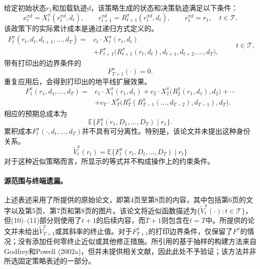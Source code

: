 \documentclass{article}
\begin{document}
给定初始状态$r_1$和加载轨迹$d$，该策略生成的状态和决策轨迹满足以下条件：
\begin{equation}
x_t^{\pi d}=X_t^\pi(r_t^{\pi d},d_t),\qquad
r_{t+1}^{\pi d}=R_{t+1}^\pi(r_t^{\pi d},d_t),\qquad
r_1^{\pi d}=r_1,
\quad t\in\mathcal T.
\tag{18}
\end{equation}
该政策下的实际累计成本是通过递归方式定义的。
\begin{equation}
\begin{aligned}
F_t^\pi(r_t,d_t,d_{t+1},\ldots,d_T)
={}&c_t\cdot X_t^\pi(r_t,d_t)\\
&+F_{t+1}^\pi\bigl(R_{t+1}^\pi(r_t,d_t),d_{t+1},d_{t+2},\ldots,d_T\bigr),
\end{aligned}
\qquad t\in\mathcal T,
\tag{5}
\end{equation}
带有打印出的边界条件的
\[
F_{T+1}^\pi(\cdot)=0.
\]
重复应用后，会得到打印出的地平线扩展效果。
\begin{equation}
\begin{aligned}
F_1^\pi(r_1,d_1,\ldots,d_T)
={}&c_1\cdot X_1^\pi(r_1,d_1)
+c_2\cdot X_2^\pi\bigl(R_2^\pi(r_1,d_1),d_2\bigr)+\cdots\\
&+c_T\cdot X_T^\pi\bigl(R_T^\pi(R_{T-1}^\pi(\ldots,d_{T-2}),d_{T-1}),d_T\bigr).
\end{aligned}
\tag{6}
\end{equation}
相应的预期总成本为
\[
\mathbb E\bigl\{F_1^\pi(r_1,D_1,\ldots,D_T)\mid r_1\bigr\}.
\]
累积成本$F_t^\pi(\cdot,d_t,\ldots,d_T)$并不具有可分离性。特别是，该论文并未提出这种身份关系。
\[
\tilde V_t^\pi(r_t)
=\mathbb E\bigl\{F_t^\pi(r_t,D_t,\ldots,D_T)\mid r_t\bigr\}
\]
对于这种近似策略而言，所显示的等式并不构成操作上的约束条件。

\paragraph{源范围与终端遗漏。}
上述表述采用了所提供的原始论文，即第4页至第8页的内容，其中包括第6页的文字以及第5页、第7页和第8页的图片。该论文将近似函数描述为$\{\tilde V_t^\pi(\cdot):t\in\mathcal T\}$，但(10)--(11)部分则使用了$t+1$的后续内容，而$T+1$则包含在$t=T$中。所提供的论文并未给出$\tilde V_{T+1}^\pi$或其斜率的终止值。对于$F_{T+1}^\pi$的打印边界条件，仅保留了$F^\pi$的情况；没有添加任何零终止近似或其他修正措施。所引用的基于抽样的构建方法来自Godfrey和Powell (2002a)，但并未提供相关文献，因此此处不予验证；该方法并非所选固定策略表述的一部分。
\end{document}

